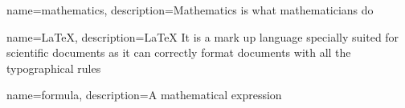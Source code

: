 {
    name=mathematics,
    description={Mathematics is what mathematicians do}
}

{
    name=LaTeX,
    description={LaTeX It is a mark up language specially suited for scientific documents as it can correctly format documents with all the typographical rules}
}


{
    name=formula,
    description={A mathematical expression}
}
\fi
